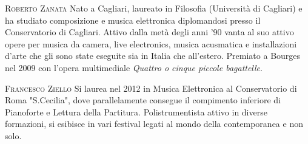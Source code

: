 \documentclass[9pt, twoside, a5paper]{extreport}
\newcommand{\biografia}[2]{%
\noindent \textsc{#1} %
#2 %
\medskip
}%
\begin{document}
\begin{multicols}{2}
\biografia{Roberto Zanata}{Nato a Cagliari, laureato in Filosofia (Università di Cagliari) e ha studiato composizione e musica elettronica diplomandosi presso il Conservatorio di Cagliari. Attivo dalla metà degli anni '90 vanta al suo attivo opere per musica da camera, live electronics, musica acusmatica e installazioni d'arte che gli sono state eseguite sia in Italia che all'estero. Premiato a Bourges nel 2009 con l'opera multimediale \textit{Quattro o cinque piccole bagattelle}.}

\biografia{Francesco Ziello}{Si laurea nel 2012 in Musica Elettronica al Conservatorio di Roma "S.Cecilia", dove parallelamente consegue il compimento inferiore di Pianoforte e Lettura della Partitura. Polistrumentista attivo in diverse formazioni, si esibisce in vari festival legati al mondo della contemporanea e non solo.}

\biografia{}{}

\biografia{}{}

\biografia{}{}

\biografia{}{}

\biografia{}{}


\end{multicols}

\clearpage

\section*{ }

\end{document}

